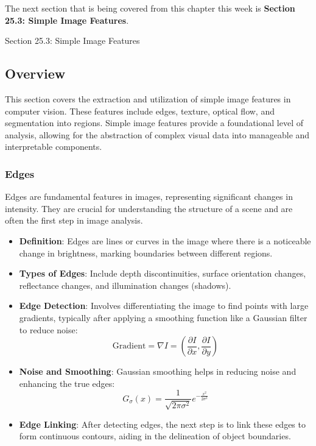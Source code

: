 The next section that is being covered from this chapter this week is \textbf{Section 25.3: Simple Image Features}.

\begin{notes}{Section 25.3: Simple Image Features}
    \subsection*{Overview}

    This section covers the extraction and utilization of simple image features in computer vision. These features include edges, texture, optical flow, and segmentation into regions. Simple image features 
    provide a foundational level of analysis, allowing for the abstraction of complex visual data into manageable and interpretable components.
    
    \subsubsection*{Edges}
    
    Edges are fundamental features in images, representing significant changes in intensity. They are crucial for understanding the structure of a scene and are often the first step in image analysis.
    
    \begin{highlight}[Edges]
    
        \begin{itemize}
            \item \textbf{Definition}: Edges are lines or curves in the image where there is a noticeable change in brightness, marking boundaries between different regions.
            \item \textbf{Types of Edges}: Include depth discontinuities, surface orientation changes, reflectance changes, and illumination changes (shadows).
            \item \textbf{Edge Detection}: Involves differentiating the image to find points with large gradients, typically after applying a smoothing function like a Gaussian filter to reduce noise:
            \[
            \text{Gradient} = \nabla I = \left(\frac{\partial I}{\partial x}, \frac{\partial I}{\partial y}\right)
            \]
            \item \textbf{Noise and Smoothing}: Gaussian smoothing helps in reducing noise and enhancing the true edges:
            \[
            G_\sigma(x) = \frac{1}{\sqrt{2\pi\sigma^2}} e^{-\frac{x^2}{2\sigma^2}}
            \]
            \item \textbf{Edge Linking}: After detecting edges, the next step is to link these edges to form continuous contours, aiding in the delineation of object boundaries.
        \end{itemize}
    

\end{highlight}
\end{notes}

